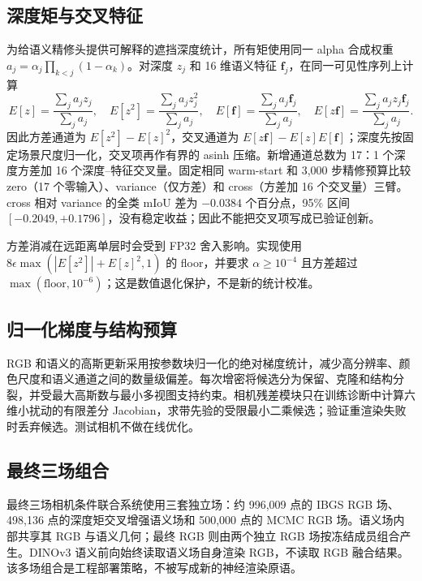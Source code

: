 \documentclass[UTF8,a4paper,11pt]{ctexart}
\begin{document}
\subsection{深度矩与交叉特征}
为给语义精修头提供可解释的遮挡深度统计，所有矩使用同一 alpha 合成权重 $a_j=\alpha_j\prod_{k<j}(1-\alpha_k)$。对深度 $z_j$ 和 16 维语义特征 $\mathbf f_j$，在同一可见性序列上计算
\begin{equation}
 E[z]=\frac{\sum_j a_jz_j}{\sum_ja_j},\quad E[z^2]=\frac{\sum_ja_jz_j^2}{\sum_ja_j},\quad E[\mathbf f]=\frac{\sum_ja_j\mathbf f_j}{\sum_ja_j},\quad E[z\mathbf f]=\frac{\sum_ja_jz_j\mathbf f_j}{\sum_ja_j}.
\end{equation}
因此方差通道为 $E[z^2]-E[z]^2$，交叉通道为 $E[z\mathbf f]-E[z]E[\mathbf f]$；深度先按固定场景尺度归一化，交叉项再作有界的 asinh 压缩。新增通道总数为 17：1 个深度方差加 16 个深度--特征交叉量。固定相同 warm-start 和 3,000 步精修预算比较 zero（17 个零输入）、variance（仅方差）和 cross（方差加 16 个交叉量）三臂。cross 相对 variance 的全类 mIoU 差为 $-0.0384$ 个百分点，95\% 区间 $[-0.2049,+0.1796]$，没有稳定收益；因此不能把交叉项写成已验证创新。

方差消减在远距离单层时会受到 FP32 舍入影响。实现使用 $8\epsilon\max(|E[z^2]|+E[z]^2,1)$ 的 floor，并要求 $\alpha\ge10^{-4}$ 且方差超过 $\max(\mathrm{floor},10^{-6})$；这是数值退化保护，不是新的统计校准。

\subsection{归一化梯度与结构预算}
RGB 和语义的高斯更新采用按参数块归一化的绝对梯度统计，减少高分辨率、颜色尺度和语义通道之间的数量级偏差。每次增密将候选分为保留、克隆和结构分裂，并受最大高斯数与最小多视图支持约束。相机残差模块只在训练诊断中计算六维小扰动的有限差分 Jacobian，求带先验的受限最小二乘候选；验证重渲染失败时丢弃候选。测试相机不做在线优化。

\subsection{最终三场组合}
最终三场相机条件联合系统使用三套独立场：约 996,009 点的 IBGS RGB 场、498,136 点的深度矩交叉增强语义场和 500,000 点的 MCMC RGB 场。语义场内部共享其 RGB 与语义几何；最终 RGB 则由两个独立 RGB 场按冻结成员组合产生。DINOv3 语义前向始终读取语义场自身渲染 RGB，不读取 RGB 融合结果。该多场组合是工程部署策略，不被写成新的神经渲染原语。
\end{document}
